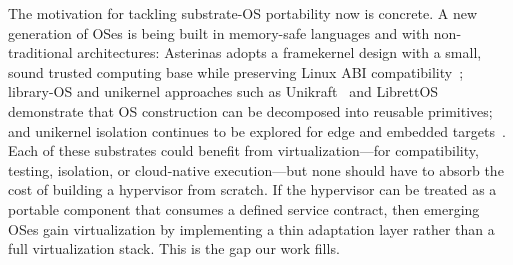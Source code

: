 The motivation for tackling substrate-OS portability now is concrete. A new
generation of OSes is being built in memory-safe languages and with
non-traditional architectures: Asterinas adopts a framekernel design with a
small, sound trusted computing base while preserving Linux ABI
compatibility~\cite{peng2025asterinas, peng2024framekernel}; library-OS and
unikernel approaches such as Unikraft~\cite{kuenzer2021unikraft} and
LibrettOS~\cite{nikolaev2020librettos} demonstrate that OS construction can be
decomposed into reusable primitives; and unikernel isolation continues to be
explored for edge and embedded targets~\cite{kaiser2024unikernels,
ueda2024mewz}. Each of these substrates could benefit from
virtualization---for compatibility, testing, isolation, or cloud-native
execution---but none should have to absorb the cost of building a hypervisor
from scratch. If the hypervisor can be treated as a portable component that
consumes a defined service contract, then emerging OSes gain virtualization by
implementing a thin adaptation layer rather than a full virtualization stack.
This is the gap our work fills.
